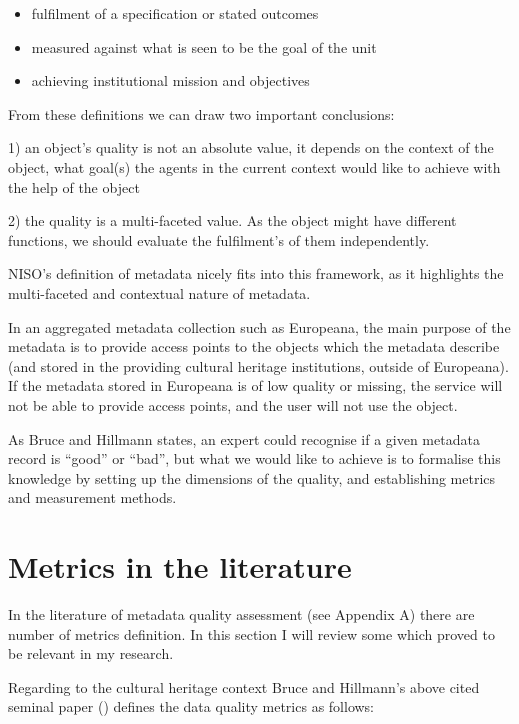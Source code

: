 \begin{itemize}
 \setlength{\parskip}{0pt}
 \setlength{\itemsep}{0pt plus 1pt}
 \item fulfilment of a specification or stated outcomes
 \item measured against what is seen to be the goal of the unit
 \item achieving institutional mission and objectives
\end{itemize}

From these definitions we can draw two important conclusions:

1) an object's quality is not an absolute value, it depends on the context of the object, what goal(s) the agents in the current context would like to achieve with the help of the object

2) the quality is a multi-faceted value. As the object might have different functions, we should evaluate the fulfilment's of them independently.

NISO's definition of metadata nicely fits into this framework, as it highlights the multi-faceted and contextual nature of metadata.

In an aggregated metadata collection such as Europeana, the main purpose of the metadata is to provide access points to the objects which the metadata describe (and stored in the providing cultural heritage institutions, outside of Europeana). If the metadata stored in Europeana is of low quality or missing, the service will not be able to provide access points, and the user will not use the object.


As Bruce and Hillmann states, an expert could recognise if a given metadata record is ``good'' or ``bad'', but what we would like to achieve is to formalise this knowledge by setting up the dimensions of the quality, and establishing metrics and measurement methods.

\section{Metrics in the literature}

In the literature of metadata quality assessment (see Appendix A) there are number of metrics definition. In this section I will review some which proved to be relevant in my research.

Regarding to the cultural heritage context Bruce and Hillmann's above cited seminal paper (\cite{bruce-hillmann2004}) defines the data quality metrics as follows:

